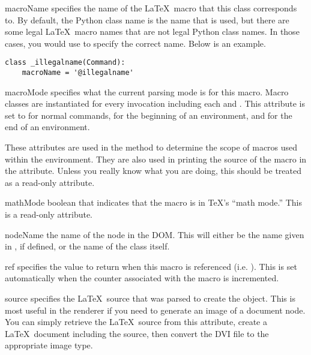 \begin{memberdesc}[Macro]{macroName}
specifies the name of the \LaTeX\ macro that this class corresponds to.  
By default, the Python class name is the name that is used, but there are
some legal \LaTeX\ macro names that are not legal Python class names.
In those cases, you would use  to specify the correct
name.  Below is an example.
\begin{verbatim}
class _illegalname(Command):
    macroName = '@illegalname'
\end{verbatim}
\end{memberdesc}

\begin{memberdesc}[Macro]{macroMode}
specifies what the current parsing mode is for this macro.  Macro classes
are instantiated for every invocation including each  and 
.  This attribute is set to  for normal
commands,  for the beginning of an environment,
and  for the end of an environment.  

These attributes are used in the  method to determine the
scope of macros used within the environment.  They are also used in printing
the source of the macro in the  attribute.  Unless you 
really know what you are doing, this should be treated as a read-only attribute.
\end{memberdesc}

\begin{memberdesc}[Macro]{mathMode}
boolean that indicates that the macro is in \TeX's ``math mode.''  This
is a read-only attribute.
\end{memberdesc}

\begin{memberdesc}[Macro]{nodeName}
the name of the node in the DOM.  This will either be the name given in
, if defined, or the name of the class itself.
\end{memberdesc}

\begin{memberdesc}[Macro]{ref}
specifies the value to return when this macro is referenced (i.e. ).
This is set automatically when the counter associated with the macro is
incremented.
\end{memberdesc}

\begin{memberdesc}[Macro]{source}
specifies the \LaTeX\ source that was parsed to create the object.  This
is most useful in the renderer if you need to generate an image of a
document node.  You can simply retrieve the \LaTeX\ source from this 
attribute, create a \LaTeX\ document including the source, then convert
the DVI file to the appropriate image type.
\end{memberdesc}

